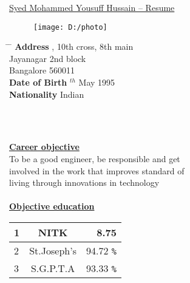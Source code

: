 \documentclass[10pt]{article}
\begin{document}
	
\begin{tabbing}
	\hspace{1cm}
	\underline{\LARGE{Syed Mohammed Yousuff Hussain -- Resume}} %
\end{tabbing}

	\begin{figure}[h]
		\texttt{[image: D:/photo]}
	\end{figure}
	
\parbox{1.5\textwidth}{ %
	\begin{tabbing} %
		\hspace{3cm} \= \hspace{4cm} \= \kill %
		{\bf Address} , 10th cross, 8th main\\ %
		\> Jayanagar 2nd block\\ %
		\> Bangalore 560011\\ %
		{\bf Date of Birth} $^{th}$ May 1995  \\ %
		{\bf Nationality} \> Indian %
	\end{tabbing}}
	\hfill\\
	\hfill\\
	\hfill %
	
		\underline{\textbf{\Large{Career objective}}}\\
		
		To be a good engineer, be responsible and get\\ involved in the work that improves standard of\\ living through innovations in technology\\
		
	\hfill\\	
	\underline{\textbf{\Large{Objective education}}}
	\vspace{1cm}
	
	
	\begin{tabular}{|l|c|r|}
		\hline
		1 & NITK & 8.75 \\
		\hline
		2 & St.Joseph's & 94.72 \verb|%| \\
		\hline
		3 & S.G.P.T.A & 93.33 \verb|%|\\
		\hline
	\end{tabular}
	
	
	
	\hfill
	\vspace{1cm}
	
\end{document}
